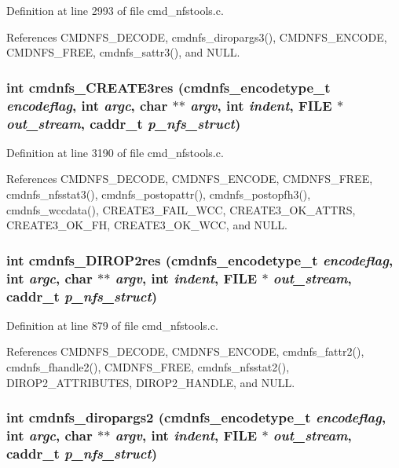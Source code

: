 Definition at line 2993 of file cmd\_\-nfstools.c.

References CMDNFS\_\-DECODE, cmdnfs\_\-diropargs3(), CMDNFS\_\-ENCODE, CMDNFS\_\-FREE, cmdnfs\_\-sattr3(), and NULL.
\subsubsection{\setlength{\rightskip}{0pt plus 5cm}int cmdnfs\_\-CREATE3res ({\bf cmdnfs\_\-encodetype\_\-t} {\em encodeflag}, int {\em argc}, char $\ast$$\ast$ {\em argv}, int {\em indent}, FILE $\ast$ {\em out\_\-stream}, caddr\_\-t {\em p\_\-nfs\_\-struct})}\label{cmd__nfstools_8c_a103}




Definition at line 3190 of file cmd\_\-nfstools.c.

References CMDNFS\_\-DECODE, CMDNFS\_\-ENCODE, CMDNFS\_\-FREE, cmdnfs\_\-nfsstat3(), cmdnfs\_\-postopattr(), cmdnfs\_\-postopfh3(), cmdnfs\_\-wccdata(), CREATE3\_\-FAIL\_\-WCC, CREATE3\_\-OK\_\-ATTRS, CREATE3\_\-OK\_\-FH, CREATE3\_\-OK\_\-WCC, and NULL.
\subsubsection{\setlength{\rightskip}{0pt plus 5cm}int cmdnfs\_\-DIROP2res ({\bf cmdnfs\_\-encodetype\_\-t} {\em encodeflag}, int {\em argc}, char $\ast$$\ast$ {\em argv}, int {\em indent}, FILE $\ast$ {\em out\_\-stream}, caddr\_\-t {\em p\_\-nfs\_\-struct})}\label{cmd__nfstools_8c_a71}




Definition at line 879 of file cmd\_\-nfstools.c.

References CMDNFS\_\-DECODE, CMDNFS\_\-ENCODE, cmdnfs\_\-fattr2(), cmdnfs\_\-fhandle2(), CMDNFS\_\-FREE, cmdnfs\_\-nfsstat2(), DIROP2\_\-ATTRIBUTES, DIROP2\_\-HANDLE, and NULL.
\subsubsection{\setlength{\rightskip}{0pt plus 5cm}int cmdnfs\_\-diropargs2 ({\bf cmdnfs\_\-encodetype\_\-t} {\em encodeflag}, int {\em argc}, char $\ast$$\ast$ {\em argv}, int {\em indent}, FILE $\ast$ {\em out\_\-stream}, caddr\_\-t {\em p\_\-nfs\_\-struct})}\label{cmd__nfstools_8c_a72}




